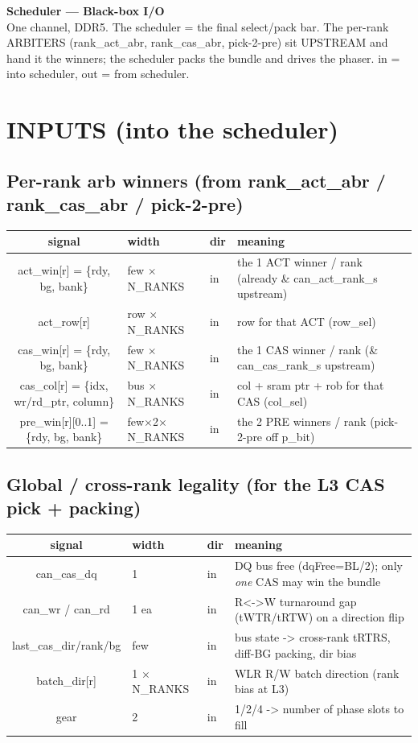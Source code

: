 \documentclass[9pt]{extarticle}
\newenvironment{io}{%
  \footnotesize\begin{longtable}{S W P M}
  \rowcolor{hb}\textbf{signal} & \textbf{width} & \textbf{dir} & \textbf{meaning}\\ \midrule\endhead}
  {\bottomrule\end{longtable}}
\begin{document}
\begin{center}
{\LARGE\textbf{Scheduler --- Black-box I/O}}\\[2pt]
{\small One channel, DDR5. The scheduler = the final select/pack bar. The per-rank ARBITERS
(rank\_act\_abr, rank\_cas\_abr, pick-2-pre) sit UPSTREAM and hand it the winners; the scheduler
packs the bundle and drives the phaser. \textcolor{ingr}{in} = into scheduler, \textcolor{outg}{out}
= from scheduler.}
\end{center}

\section{INPUTS  (into the scheduler)}
\subsection{Per-rank arb winners  (from rank\_act\_abr / rank\_cas\_abr / pick-2-pre)}
\begin{io}
act\_win[r] = \{rdy, bg, bank\} & few $\times$N\_RANKS & \textcolor{ingr}{in} & the 1 ACT winner / rank (already \& can\_act\_rank\_s upstream)\\
act\_row[r] & row $\times$N\_RANKS & \textcolor{ingr}{in} & row for that ACT (row\_sel)\\
cas\_win[r] = \{rdy, bg, bank\} & few $\times$N\_RANKS & \textcolor{ingr}{in} & the 1 CAS winner / rank (\& can\_cas\_rank\_s upstream)\\
cas\_col[r] = \{idx, wr/rd\_ptr, column\} & bus $\times$N\_RANKS & \textcolor{ingr}{in} & col + sram ptr + rob for that CAS (col\_sel)\\
pre\_win[r][0..1] = \{rdy, bg, bank\} & few$\times$2$\times$N\_RANKS & \textcolor{ingr}{in} & the 2 PRE winners / rank (pick-2-pre off p\_bit)\\
\end{io}
\subsection{Global / cross-rank legality  (for the L3 CAS pick + packing)}
\begin{io}
can\_cas\_dq & 1 & \textcolor{ingr}{in} & DQ bus free (dqFree=BL/2); only \emph{one} CAS may win the bundle\\
can\_wr / can\_rd & 1 ea & \textcolor{ingr}{in} & R<->W turnaround gap (tWTR/tRTW) on a direction flip\\
last\_cas\_dir/rank/bg & few & \textcolor{ingr}{in} & bus state -> cross-rank tRTRS, diff-BG packing, dir bias\\
batch\_dir[r] & 1 $\times$N\_RANKS & \textcolor{ingr}{in} & WLR R/W batch direction (rank bias at L3)\\
gear & 2 & \textcolor{ingr}{in} & 1/2/4 -> number of phase slots to fill\\
\end{io}
\end{document}
